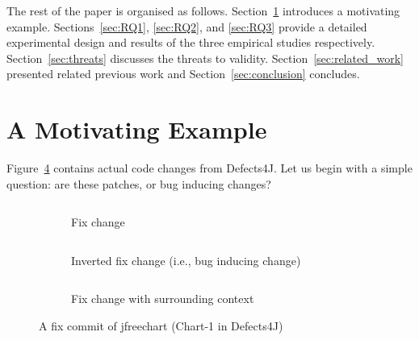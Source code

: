 \documentclass[conference]{IEEEtran}
\def\d4j{Defects4J\xspace}
\begin{document}
The rest of the paper is organised as follows.
Section~\ref{sec:motivating_example} introduces a motivating example.
Sections~\ref{sec:RQ1}, \ref{sec:RQ2}, and \ref{sec:RQ3} provide a detailed
experimental design and results of the three empirical studies respectively.
Section~\ref{sec:threats} discusses the threats to validity.
Section~\ref{sec:related_work} presented related previous work and
Section~\ref{sec:conclusion} concludes. 

\section{A Motivating Example}
\label{sec:motivating_example}

Figure~\ref{fig:motivating_example} contains actual code changes from \d4j.
Let us begin with a simple question: are these patches, or bug inducing changes?

\begin{figure}[!ht]
    \centering
    \begin{subfigure}{\linewidth}
        \centering\inputminted[escapeinside=||]{diff}{figures/diff/Chart_1.diff}
        \caption{Fix change}
        \label{fig:motivating_example1}
        \vspace{1.5em}
    \end{subfigure}

    \begin{subfigure}{\linewidth}
        \centering\inputminted[escapeinside=||]{diff}{figures/diff/Chart_1_inverted.diff}
        \caption{Inverted fix change (i.e., bug inducing change)}
        \label{fig:motivating_example2}
        \vspace{1.5em}
    \end{subfigure}

    \begin{subfigure}{\linewidth}
        \centering\inputminted[xleftmargin=15pt, linenos,
        breaklines,breakanywhere,
        escapeinside=||]{diff}{figures/diff/Chart_1_extended.diff}
        \caption{Fix change with surrounding context}
        \label{fig:motivating_example3}        
    \end{subfigure}

    \caption{A fix commit of jfreechart (Chart-1 in \d4j)}
    \label{fig:motivating_example}
\end{figure}
\end{document}
